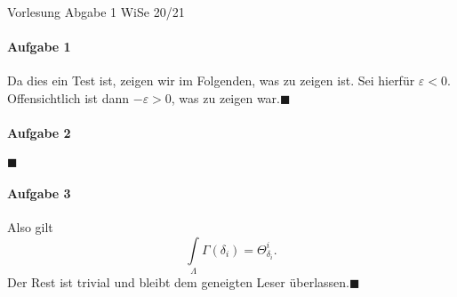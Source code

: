\documentclass[a4paper]{article}
\begin{document}
\renewcommand{\rmdefault}{\sfdefault}
\newcommand{\quoderat}{\hfill$\blacksquare$}
\setlength{\parindent}{0pt}
\pagestyle{fancy}
\lhead
  {
  Vorlesung}
\chead
  {
  \Large Abgabe 1}
\rhead
  {
  WiSe 20/21}
\paragraph{Aufgabe 1} Da dies ein Test ist, zeigen wir im Folgenden, was zu zeigen ist. Sei hierfür $\varepsilon < 0$.
Offensichtlich ist dann $-\varepsilon > 0$, was zu zeigen war.\quoderat
\paragraph{Aufgabe 2} \blindtext\quoderat
\paragraph{Aufgabe 3} \blindtext
Also gilt
\[\int\limits_\Lambda \Gamma(\delta_i)=\Theta^i_{\delta_i}.\]
\blindtext
Der Rest ist trivial und bleibt dem geneigten Leser überlassen.\quoderat
\cfoot
  {
  \hphantom{X}}
\rfoot
  {\thepage}
\end{document}
